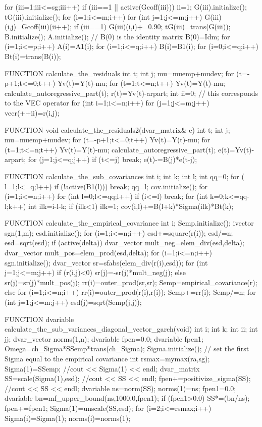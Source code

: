   for (iii=1;iii<=sg;iii++) {
    if (iii==1 || active(Gcoff(iii))) {
      ii=1;
      G(iii).initialize();
      tG(iii).initialize();
      for (i=1;i<=m;i++) {
        for (int j=1;j<=m;j++) {
          G(iii)(i,j)=Gcoff(iii)(ii++);
        }   
        if (iii==1) G(iii)(i,i)+=0.90;
      }
    }
    tG(iii)=trans(G(iii));
  }
  B.initialize();
  A.initialize();
  // B(0) is the identity matrix
  B(0)=Idm;
  for (i=1;i<=p;i++) A(i)=A1(i);
  for (i=1;i<=q;i++) B(i)=B1(i);
  for (i=0;i<=q;i++) Bt(i)=trans(B(i));
  
FUNCTION calculate_the_residuals 
  int t; int j;
  mu=muemp+mudev;
  for (t=-p+1;t<=0;t++) Yv(t)=Y(t)-mu;
  for (t=1;t<=n;t++) {
    Yv(t)=Y(t)-mu;
    calculate_autoregressive_part(t);
    r(t)=Yv(t)-arpart;
  }
  int ii=0;
  // this corresponds to the VEC operator
  for (int i=1;i<=n;i++) 
    for (j=1;j<=m;j++) vecr(++ii)=r(i,j);
  
FUNCTION void calculate_the_residuals2(dvar_matrix& e)
  int t; int j;
  mu=muemp+mudev;
  for (t=-p+1;t<=0;t++) Yv(t)=Y(t)-mu;
  for (t=1;t<=n;t++) {
    Yv(t)=Y(t)-mu;
    calculate_autoregressive_part(t);
    e(t)=Yv(t)-arpart;
    for (j=1;j<=q;j++) {
      if (t<=j) break;
      e(t)-=B(j)*e(t-j);
    }  
  }
  
FUNCTION calculate_the_sub_covariances
  int i; int k; int l;
  int qq=0;
  for ( l=1;l<=q;l++) {
    if (!active(B1(l))) break;
    qq=l;
  }
  cov.initialize();
  for (i=1;i<=n;i++) {
    for (int l=0;l<=qq;l++) {
      if (i<=l) break;
      for (int k=0;k<=qq-l;k++) {
        int ilk=i-l-k;
        if (ilk<1) ilk=1;
        cov(i,l)+=B(l+k)*Sigma(ilk)*Bt(k);
      }	
    }
  }  	
  
FUNCTION calculate_the_empirical_covariance
  int i;
  Semp.initialize();
  ivector sgn(1,m);
  esd.initialize();
  for (i=1;i<=n;i++) {
    esd+=square(r(i));
  }
  esd/=n;
  esd=sqrt(esd);
  if (active(delta)) {
    dvar_vector mult_neg=elem_div(esd,delta);
    dvar_vector mult_pos=elem_prod(esd,delta);
    for (i=1;i<=n;i++) {
      sgn.initialize();
      dvar_vector sr=sfabs(elem_div(r(i),esd));
      for (int j=1;j<=m;j++)
        if (r(i,j)<0) 
          sr(j)=-sr(j)*mult_neg(j);
        else
          sr(j)=sr(j)*mult_pos(j);
      rr(i)=outer_prod(sr,sr);
    }
    Semp=empirical_covariance(r);
  }
  else
  {
    for (i=1;i<=n;i++) {
      rr(i)=outer_prod(r(i),r(i));
      Semp+=rr(i);
    }
    Semp/=n;
  }
  for (int j=1;j<=m;j++)
    esd(j)=sqrt(Semp(j,j));
  
  
FUNCTION dvariable calculate_the_sub_variances_diagonal_vector_garch(void)
  int i; int k; int ii; int jj;
  dvar_vector norms(1,n);
  dvariable fpen=0.0;
  dvariable fpen1;
  Omega=ch_Sigma*SSemp*trans(ch_Sigma);
  Sigma.initialize();
  // set the first Sigma equal to the empirical covariance
  int rsmax=mymax(ra,sg);
  Sigma(1)=SSemp;
  //cout << Sigma(1) << endl;
  dvar_matrix SS=scale(Sigma(1),esd);
  //cout << SS << endl;
  fpen+=positivize_sigma(SS);
  //cout << SS << endl;
  dvariable ns=norm(SS);
   norms(1)=ns;
  fpen1=0.0;
  dvariable bn=mf_upper_bound(ns,1000.0,fpen1);
  if (fpen1>0.0) {
    SS*=(bn/ns);
    fpen+=fpen1;
  }
  Sigma(1)=unscale(SS,esd);
  for (i=2;i<=rsmax;i++) {
    Sigma(i)=Sigma(1);
    norms(i)=norms(1);
  }

